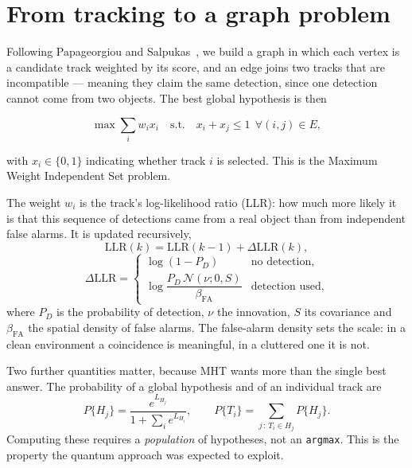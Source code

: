 \documentclass[10pt,twocolumn]{article}
\begin{document}
\section{From tracking to a graph problem}

Following Papageorgiou and Salpukas~\cite{papa2009}, we build a graph in which
each vertex is a candidate track weighted by its score, and an edge joins two
tracks that are incompatible --- meaning they claim the same detection, since one
detection cannot come from two objects. The best global hypothesis is then

\begin{equation}
  \max \sum_i w_i x_i
  \quad\text{s.t.}\quad
  x_i + x_j \le 1 \ \ \forall (i,j) \in E ,
  \label{eq:mwis}
\end{equation}

with $x_i \in \{0,1\}$ indicating whether track $i$ is selected. This is the
Maximum Weight Independent Set problem.

The weight $w_i$ is the track's log-likelihood ratio (LLR): how much more likely
it is that this sequence of detections came from a real object than from
independent false alarms. It is updated recursively,
\begin{equation}
  \mathrm{LLR}(k) = \mathrm{LLR}(k-1) + \Delta\mathrm{LLR}(k),
\end{equation}
\begin{equation}
  \Delta\mathrm{LLR} =
  \begin{cases}
    \log(1-P_D) & \text{no detection},\\[2pt]
    \log \dfrac{P_D\, \mathcal{N}(\nu;0,S)}{\beta_{\mathrm{FA}}}
      & \text{detection used},
  \end{cases}
\end{equation}
where $P_D$ is the probability of detection, $\nu$ the innovation, $S$ its
covariance and $\beta_{\mathrm{FA}}$ the spatial density of false alarms. The
false-alarm density sets the scale: in a clean environment a coincidence is
meaningful, in a cluttered one it is not.

Two further quantities matter, because MHT wants more than the single best
answer. The probability of a global hypothesis and of an individual track are
\begin{equation}
  P\{H_j\} = \frac{e^{L_{H_j}}}{1 + \sum_i e^{L_{H_i}}},
  \qquad
  P\{T_i\} = \!\!\sum_{j\,:\,T_i \in H_j}\!\! P\{H_j\}.
  \label{eq:probs}
\end{equation}
Computing these requires a \emph{population} of hypotheses, not an
\texttt{argmax}. This is the property the quantum approach was expected to
exploit.
\end{document}
